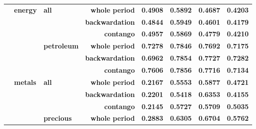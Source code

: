 \documentclass[
  authoryear,
  preprint,
  3p]{elsarticle}
\begin{document}
\begin{longtable}[t]{>{}l>{}l>{}l>{}r>{}r>{}r>{}r>{}r}
\textbf{} & \textbf{energy} & \textbf{all} & \textbf{whole period} & \textcolor[HTML]{4285f4}{\textbf{0.4908}} & \textcolor[HTML]{4285f4}{\textbf{0.5892}} & \textcolor[HTML]{4285f4}{\textbf{0.4687}} & \textcolor[HTML]{4285f4}{\textbf{0.4203}}\\
\textbf{} & \textbf{} & \textbf{} & \textbf{backwardation} & \textcolor[HTML]{4285f4}{\textbf{0.4844}} & \textcolor[HTML]{4285f4}{\textbf{0.5949}} & \textcolor[HTML]{4285f4}{\textbf{0.4601}} & \textcolor[HTML]{4285f4}{\textbf{0.4179}}\\
\addlinespace
\textbf{} & \textbf{} & \textbf{} & \textbf{contango} & \textcolor[HTML]{4285f4}{\textbf{0.4957}} & \textcolor[HTML]{4285f4}{\textbf{0.5869}} & \textcolor[HTML]{4285f4}{\textbf{0.4779}} & \textcolor[HTML]{4285f4}{\textbf{0.4210}}\\
\textbf{} & \textbf{} & \textbf{petroleum} & \textbf{whole period} & \textcolor[HTML]{4285f4}{\textbf{0.7278}} & \textcolor[HTML]{4285f4}{\textbf{0.7846}} & \textcolor[HTML]{4285f4}{\textbf{0.7692}} & \textcolor[HTML]{4285f4}{\textbf{0.7175}}\\
\textbf{} & \textbf{} & \textbf{} & \textbf{backwardation} & \textcolor[HTML]{4285f4}{\textbf{0.6962}} & \textcolor[HTML]{4285f4}{\textbf{0.7854}} & \textcolor[HTML]{4285f4}{\textbf{0.7727}} & \textcolor[HTML]{4285f4}{\textbf{0.7282}}\\
\textbf{} & \textbf{} & \textbf{} & \textbf{contango} & \textcolor[HTML]{4285f4}{\textbf{0.7606}} & \textcolor[HTML]{4285f4}{\textbf{0.7856}} & \textcolor[HTML]{4285f4}{\textbf{0.7716}} & \textcolor[HTML]{4285f4}{\textbf{0.7134}}\\
\textbf{} & \textbf{metals} & \textbf{all} & \textbf{whole period} & \textcolor[HTML]{4285f4}{\textbf{0.2167}} & \textcolor[HTML]{4285f4}{\textbf{0.5553}} & \textcolor[HTML]{4285f4}{\textbf{0.5877}} & \textcolor[HTML]{4285f4}{\textbf{0.4721}}\\
\addlinespace
\textbf{} & \textbf{} & \textbf{} & \textbf{backwardation} & \textcolor[HTML]{4285f4}{\textbf{0.2201}} & \textcolor[HTML]{4285f4}{\textbf{0.5418}} & \textcolor[HTML]{4285f4}{\textbf{0.6353}} & \textcolor[HTML]{4285f4}{\textbf{0.4155}}\\
\textbf{} & \textbf{} & \textbf{} & \textbf{contango} & \textcolor[HTML]{4285f4}{\textbf{0.2145}} & \textcolor[HTML]{4285f4}{\textbf{0.5727}} & \textcolor[HTML]{4285f4}{\textbf{0.5709}} & \textcolor[HTML]{4285f4}{\textbf{0.5035}}\\
\textbf{} & \textbf{} & \textbf{precious} & \textbf{whole period} & \textcolor[HTML]{4285f4}{\textbf{0.2883}} & \textcolor[HTML]{4285f4}{\textbf{0.6305}} & \textcolor[HTML]{4285f4}{\textbf{0.6704}} & \textcolor[HTML]{4285f4}{\textbf{0.5762}}\\

\end{longtable}
\end{document}
